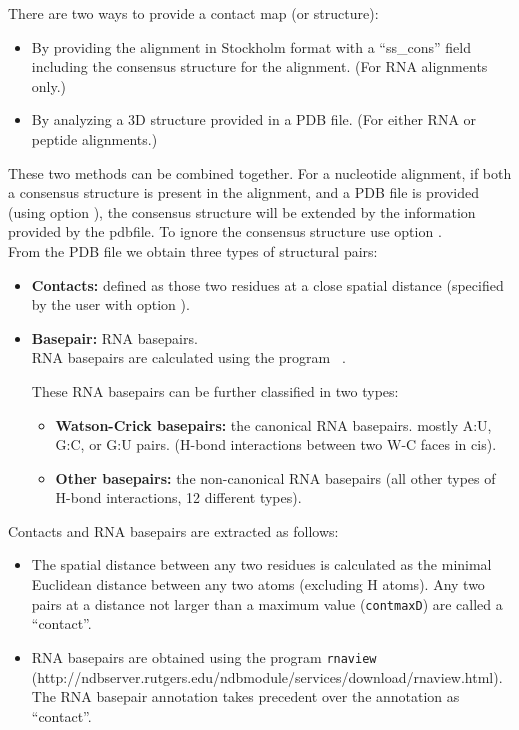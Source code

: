 \noindent
There are two ways to provide a contact map (or structure):

\begin{itemize}

\item By providing the alignment in Stockholm format with a ``ss\_cons'' field including the consensus
structure for the alignment. (For RNA alignments only.)

\item By analyzing a 3D structure provided in a PDB file. (For either RNA or peptide alignments.)\\
\end{itemize}

\noindent
These two methods can be combined together. For a nucleotide
alignment, if both a consensus structure is present in the alignment,
and a PDB file is provided (using option ), the
consensus structure will be extended by the information provided by
the pdbfile.  To ignore the consensus structure use
option .\\


\noindent
From the PDB file we obtain three types of structural pairs:

\begin{itemize}
\item \textbf{Contacts:} defined as those two residues at a close spatial distance (specified by the user with option ).
\item \textbf{Basepair:} RNA basepairs. \\
RNA basepairs are calculated using the program ~\citep{YangWesthof03}.

These RNA basepairs can be further classified in two types:
\begin{itemize}
\item \textbf{Watson-Crick basepairs:} the canonical RNA basepairs. mostly A:U, G:C, or G:U pairs. (H-bond interactions between two W-C faces in cis).
\item \textbf{Other basepairs:} the non-canonical RNA basepairs (all other types of H-bond interactions, 12 different types).
\end{itemize}
\end{itemize}

Contacts and RNA basepairs are extracted as follows:
\begin{itemize}

\item The spatial distance between any two residues is calculated as the  minimal Euclidean distance between any two atoms (excluding
 H atoms). Any two pairs at a distance not larger than a maximum value
(\texttt{contmaxD}) are called a ``contact''.

\item RNA basepairs are obtained using the program \texttt{rnaview}~\citep{YangWesthof03}\\
(http://ndbserver.rutgers.edu/ndbmodule/services/download/rnaview.html).\\
The RNA basepair annotation takes precedent over the annotation as ``contact''.
\end{itemize}


